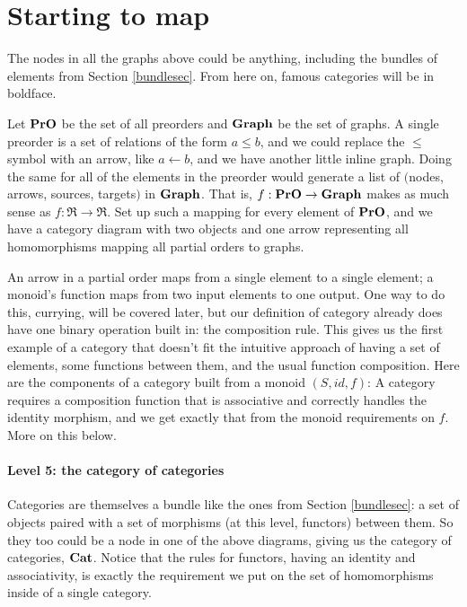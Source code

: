 \documentclass[11pt]{article}
\begin{document}
\section{Starting to map}
The nodes in all the graphs above could be anything, including the bundles of elements from
Section \ref{bundlesec}. From here on, famous categories will be in boldface.

Let ${\bf PrO}$ be the set of all preorders and ${\bf Graph}$ be the set of graphs. A
single preorder is a set of relations of the form $a \leq b$, and we could replace the $\leq$
symbol with an arrow, like $a\leftarrow b$, and we have another little inline graph. 
Doing the same for all of the elements in the preorder would generate a list of
$($nodes, arrows, sources, targets$)$ in ${\bf Graph}$.
That is, $f:{\bf PrO}\to {\bf Graph}$ makes as much sense as $f:\Re \to \Re$. Set up such
a mapping for every element of ${\bf PrO}$, and we have a category diagram with two
objects and one arrow representing all homomorphisms mapping all partial orders to graphs.

An arrow in a partial order maps from a single element to a single element; a monoid's
function maps from two input elements to one output. One way to do this, currying, will be
covered later, but our definition of category already does have one binary operation
built in: the composition rule. This gives us the first example of a category that
doesn't fit the intuitive approach of having a set of elements, some functions between
them, and the usual function composition. Here are the components of a category built
from a monoid $(S, id, f)$:
A category requires a composition function that is associative and correctly handles the
identity morphism, and we get exactly that from the monoid requirements on $f$. More on
this below.

\paragraph{Level 5: the category of categories}
Categories are themselves a bundle like the ones from Section \ref{bundlesec}: a set
of objects paired with a set of morphisms (at this level, functors) between them. So
they too could be a node in one of the above diagrams, giving us the category of
categories, ${\bf Cat}$. Notice that the rules for functors, having an identity and
associativity, is exactly the requirement we put on the set of homomorphisms inside
of a single category.
\end{document}
